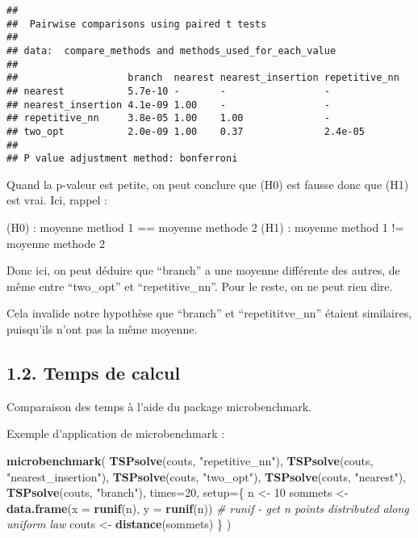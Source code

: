 \documentclass[
]{article}
\newenvironment{Shaded}{\begin{snugshade}}{\end{snugshade}}
\newcommand{\CommentTok}[1]{\textcolor[rgb]{0.56,0.35,0.01}{\textit{#1}}}
\newcommand{\DataTypeTok}[1]{\textcolor[rgb]{0.13,0.29,0.53}{#1}}
\newcommand{\DecValTok}[1]{\textcolor[rgb]{0.00,0.00,0.81}{#1}}
\newcommand{\KeywordTok}[1]{\textcolor[rgb]{0.13,0.29,0.53}{\textbf{#1}}}
\newcommand{\NormalTok}[1]{#1}
\newcommand{\StringTok}[1]{\textcolor[rgb]{0.31,0.60,0.02}{#1}}
\begin{document}
\begin{verbatim}
## 
##  Pairwise comparisons using paired t tests 
## 
## data:  compare_methods and methods_used_for_each_value 
## 
##                   branch  nearest nearest_insertion repetitive_nn
## nearest           5.7e-10 -       -                 -            
## nearest_insertion 4.1e-09 1.00    -                 -            
## repetitive_nn     3.8e-05 1.00    1.00              -            
## two_opt           2.0e-09 1.00    0.37              2.4e-05      
## 
## P value adjustment method: bonferroni
\end{verbatim}

Quand la p-valeur est petite, on peut conclure que (H0) est fausse donc
que (H1) est vrai. Ici, rappel :

(H0) : moyenne method 1 == moyenne methode 2 (H1) : moyenne method 1 !=
moyenne methode 2

Donc ici, on peut déduire que ``branch'' a une moyenne différente des
autres, de même entre ``two\_opt'' et ``repetitive\_nn''. Pour le reste,
on ne peut rien dire.

Cela invalide notre hypothèse que ``branch'' et ``repetititve\_nn''
étaient similaires, puisqu'ils n'ont pas la même moyenne.

\hypertarget{temps-de-calcul}{%
\subsection{1.2. Temps de calcul}\label{temps-de-calcul}}

Comparaison des temps à l'aide du package microbenchmark.

Exemple d'application de microbenchmark :

\begin{Shaded}
\begin{Highlighting}[]
\KeywordTok{microbenchmark}\NormalTok{(}
  \KeywordTok{TSPsolve}\NormalTok{(couts, }\StringTok{"repetitive_nn"}\NormalTok{), }\KeywordTok{TSPsolve}\NormalTok{(couts, }\StringTok{"nearest_insertion"}\NormalTok{), }\KeywordTok{TSPsolve}\NormalTok{(couts, }\StringTok{"two_opt"}\NormalTok{), }\KeywordTok{TSPsolve}\NormalTok{(couts, }\StringTok{"nearest"}\NormalTok{), }\KeywordTok{TSPsolve}\NormalTok{(couts, }\StringTok{"branch"}\NormalTok{), }
  \DataTypeTok{times=}\DecValTok{20}\NormalTok{, }
  \DataTypeTok{setup=}\NormalTok{\{}
\NormalTok{    n <-}\StringTok{ }\DecValTok{10}
\NormalTok{    sommets <-}\StringTok{ }\KeywordTok{data.frame}\NormalTok{(}\DataTypeTok{x =} \KeywordTok{runif}\NormalTok{(n), }\DataTypeTok{y =} \KeywordTok{runif}\NormalTok{(n)) }\CommentTok{# runif - get n points distributed along uniform law}
\NormalTok{    couts <-}\StringTok{ }\KeywordTok{distance}\NormalTok{(sommets)}
\NormalTok{  \}}
\NormalTok{)}
\end{Highlighting}
\end{Shaded}
\end{document}
